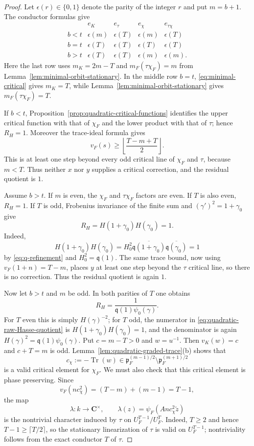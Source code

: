 \documentclass[11pt]{amsart}
\theoremstyle{definition}
\theoremstyle{remark}
\newcommand{\C}{\mathbf C}
\newcommand{\p}{\mathfrak p}
\newcommand{\Tr}{\operatorname{Tr}}
\begin{document}
\begin{proof}
Let $\epsilon(r)\in\{0,1\}$ denote the parity of the integer $r$ and
put $m=b+1$.  The conductor formulas give
\begin{equation}\label{eq:quadratic-parity-table}
 \begin{array}{c|c|c|c|c}
 &e_K&e_\tau&e_\chi&e_{\tau\chi}\\ \hline
 b<t&\epsilon(m)&\epsilon(T)&\epsilon(m)&\epsilon(T)\\
 b=t&\epsilon(T)&\epsilon(T)&\epsilon(T)&\epsilon(T)\\
 b>t&\epsilon(T)&\epsilon(T)&\epsilon(m)&\epsilon(m).
 \end{array}
\end{equation}
Here the last row uses $m_K=2m-T$ and
$m_F(\tau\chi_F)=m$ from
Lemma~\ref{lem:minimal-orbit-stationary}.  In the middle row $b=t$,
\eqref{eq:minimal-critical} gives $m_K=T$, while
Lemma~\ref{lem:minimal-orbit-stationary} gives
$m_F(\tau\chi_F)=T$.

If $b<t$, Proposition~\ref{prop:quadratic-critical-functions} identifies
the upper critical function with that of $\chi_F$ and the lower product
with that of $\tau$; hence $R_H=1$.  Moreover the trace-ideal formula
gives
\[
 v_F(s)\ge \left\lfloor\frac{T-m+T}{2}\right\rfloor.
\]
This is at least one step beyond every odd critical line of $\chi_F$ and
$\tau$, because $m<T$.  Thus neither $x$ nor $y$ supplies a critical
correction, and the residual quotient is $1$.

Assume $b>t$.  If $m$ is even, the $\chi_F$ and $\tau\chi_F$ factors
are even.  If $T$ is also even, $R_H=1$.  If $T$ is odd, Frobenius
invariance of the finite sum and
$(\gamma')^2=1+\gamma_0$ give
\[
 R_H=H(1+\gamma_0)H(\gamma_0)=1.
\]
Indeed,
\[
 H(1+\gamma_0)H(\gamma_0)
 =H_0^2\overline{\mathfrak q(1+\gamma_0)}
       \overline{\mathfrak q(\gamma_0)}=1
\]
by \eqref{eq:q-refinement} and
$H_0^2=\mathfrak q(1)$.  The same trace bound, now using
$v_F(1+n)=T-m$, places $y$ at least one step beyond the $\tau$ critical
line, so there is no correction.  Thus the residual quotient is again
$1$.

Now let $b>t$ and $m$ be odd.  In both parities of $T$ one obtains
\begin{equation}\label{eq:quadratic-high-odd-raw}
 R_H=\frac1{\mathfrak q(1)\psi_0(\gamma)}.
\end{equation}
For $T$ even this is simply $H(\gamma)^{-2}$; for $T$ odd, the numerator
in \eqref{eq:quadratic-raw-Hasse-quotient} is
$H(1+\gamma_0)H(\gamma_0)=1$, and the denominator is again
$H(\gamma)^2=\mathfrak q(1)\psi_0(\gamma)$.  Put $c=m-T>0$ and $w=u^{-1}$.  Then $v_K(w)=c$ and
$c+T=m$ is odd.  Lemma~\ref{lem:quadratic-graded-trace}(b) shows that
\[
 c_\chi:=-\Tr(w)\in\p_F^{(m-1)/2}\setminus\p_F^{(m+1)/2}
\]
is a valid critical element for $\chi_F$.  We must also check that this
critical element is phase preserving.  Since
\[
 v_F(nc_\chi^2)=(T-m)+(m-1)=T-1,
\]
the map
\[
 \lambda:k\longrightarrow\C^\times,\qquad
 \lambda(z)=\psi_F(An c_\chi^2\widetilde z)
\]
is the nontrivial character induced by $\tau$ on
$U_F^{T-1}/U_F^T$.  Indeed, $T\ge2$ and hence
$T-1\ge\lceil T/2\rceil$, so the stationary linearization of $\tau$
is valid on $U_F^{T-1}$; nontriviality follows from the exact conductor
$T$ of $\tau$.


\end{proof}
\end{document}
